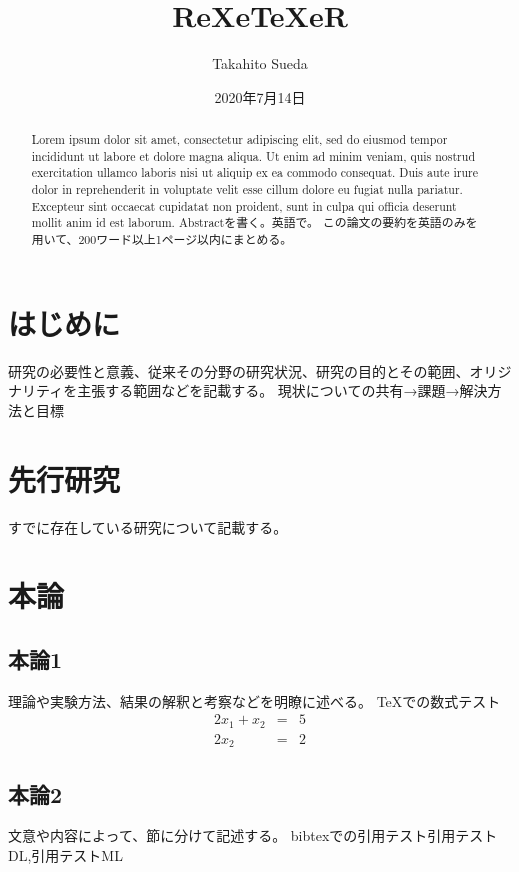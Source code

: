 \documentclass[a4paper, titlepage]{bxjsreport}
\title{ReXeTeXeR}
\author{Takahito Sueda}
\date{2020年7月14日}
\affiliation{情報システム系} %
\begin{document}
  \maketitle

  \begin{abstract}
    Lorem ipsum dolor sit amet, consectetur adipiscing elit, sed do eiusmod tempor incididunt ut labore et dolore magna aliqua. Ut enim ad minim veniam, quis nostrud exercitation ullamco laboris nisi ut aliquip ex ea commodo consequat. Duis aute irure dolor in reprehenderit in voluptate velit esse cillum dolore eu fugiat nulla pariatur. Excepteur sint occaecat cupidatat non proident, sunt in culpa qui officia deserunt mollit anim id est laborum.
    Abstractを書く。英語で。
    この論文の要約を英語のみを用いて、200ワード以上1ページ以内にまとめる。
  \end{abstract}

  \tableofcontents

  \section{はじめに}
  研究の必要性と意義、従来その分野の研究状況、研究の目的とその範囲、オリジナリティを主張する範囲などを記載する。
  現状についての共有→課題→解決方法と目標

  \section{先行研究}
  すでに存在している研究について記載する。

  \section{本論}

  \subsection{本論1}
  理論や実験方法、結果の解釈と考察などを明瞭に述べる。
  {\TeX}での数式テスト
  \begin{eqnarray}
    2x_1 + x_2 & = & 5 \\
    2x_2 & = & 2
  \end{eqnarray}

  \subsection{本論2}
  文意や内容によって、節に分けて記述する。
  bibtexでの引用テスト引用テストDL\cite{lecun2015deep},引用テストML\cite{michie1994machine}
\end{document}
